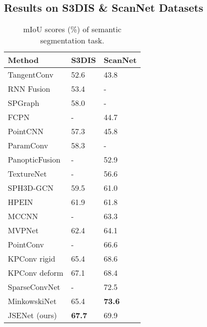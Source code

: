 \documentclass[runningheads]{llncs}
\begin{document}
\subsection{Results on S3DIS \& ScanNet Datasets} \label{S3DIS}


\begin{table}
\scriptsize
\begin{center}
\caption{{mIoU scores (\%) {of semantic segmentation task.} 
}}
\label{table:ss}
\begin{tabular}{  | m{4cm} | C{2cm}| C{2cm} |}
\hline
Method & S3DIS & ScanNet\\
\hline








TangentConv \cite{tatarchenko2018tangent} & 52.6 & 43.8\\

RNN Fusion \cite{ye20183d} & 53.4 & -\\

SPGraph \cite{landrieu2018large} & 58.0 & -\\

FCPN \cite{rethage2018fully} & - & 44.7\\

PointCNN \cite{li2018pointcnn} & 57.3 & 45.8\\

ParamConv \cite{wang2018deep} & 58.3 & -\\

PanopticFusion \cite{narita2019panopticfusion} & - & 52.9\\

TextureNet \cite{huang2019texturenet} & - & 56.6\\

SPH3D-GCN \cite{lei2019spherical} & 59.5 & 61.0\\

HPEIN \cite{jiang2019hierarchical} & 61.9 & 61.8\\

MCCNN \cite{hermosilla2018monte} & - & 63.3\\

MVPNet \cite{jaritz2019multi} & 62.4 & 64.1\\

PointConv \cite{wu2019pointconv} & - & 66.6\\

KPConv rigid \cite{thomas2019kpconv} & 65.4 & 68.6\\

KPConv deform \cite{thomas2019kpconv} & 67.1 & 68.4\\

SparseConvNet \cite{graham20183d} & - & 72.5\\

MinkowskiNet \cite{Choy_2019} & 65.4 & \textbf{73.6}\\
\hline
JSENet (ours) & \textbf{67.7} & 69.9\\
\hline
\end{tabular}
\end{center}
\end{table}
\end{document}
